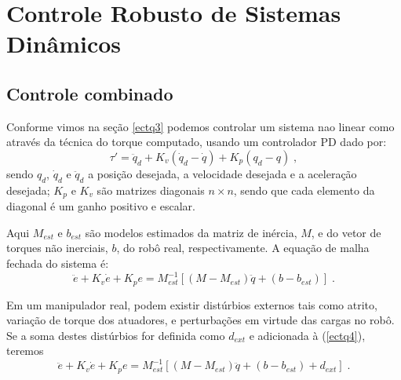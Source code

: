 \chapter{Controle Robusto de Sistemas Din\^{a}micos}

\section{Controle combinado}
Conforme vimos na seção \ref{ectq3} podemos controlar um sistema nao linear como  através da técnica do torque computado, usando um controlador PD dado por:
\begin{equation} \label{ectq3}
\tau'=\ddot{q}_d+K_v(\dot{q}_d-\dot{q})+K_p(q_d-q) \; ,
\end{equation}
sendo $q_{d}$, $\dot{q}_{d}$ e $\ddot{q}_{d}$ a posição desejada, a velocidade desejada e a aceleração desejada; $K_p$
e $K_v$ são matrizes diagonais $n \times n$, sendo que cada elemento da diagonal é um ganho positivo e escalar.

Aqui $M_{est}$ e $b_{est}$ são modelos estimados da matriz de inércia, $M$, e do vetor de torques não inerciais, $b$, do robô real,  respectivamente. A equação de malha fechada do sistema é:
\begin{equation} \label{ectq4}
\ddot{e}+K_v\dot{e}+K_pe=M_{est}^{-1}[(M-M_{est})\ddot{q}+(b-b_{est})] \; .
\end{equation}

Em um manipulador real, podem existir distúrbios externos tais como atrito, variação de torque dos atuadores, e perturbações em virtude  das cargas no robô. Se a soma destes distúrbios for definida como $d_{ext}$ e adicionada à (\ref{ectq4}), teremos
\begin{equation} \label{ectq5}
\ddot{e}+K_v\dot{e}+K_pe=M_{est}^{-1}[(M-M_{est})\ddot{q}+(b-b_{est})+d_{ext}] \; .
\end{equation}
